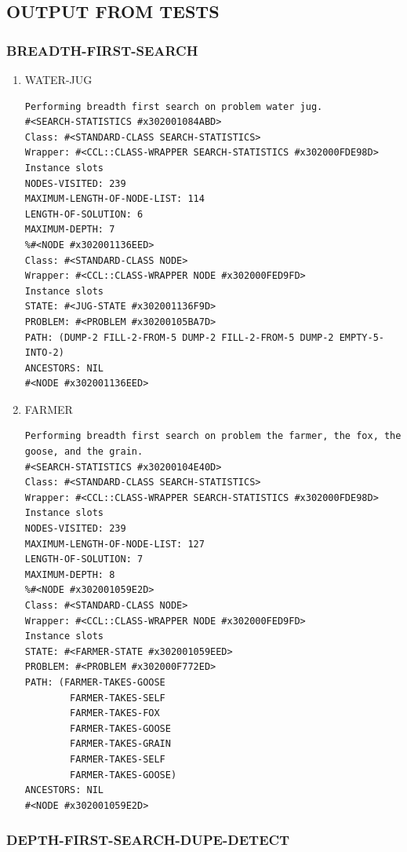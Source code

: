 \documentclass[a4paper,8pt]{article}
\begin{document}
\subsection{OUTPUT FROM TESTS}
\label{sec-1-2}

\subsubsection{BREADTH-FIRST-SEARCH}
\label{sec-1-2-1}
\begin{enumerate}
\item WATER-JUG
\label{sec-1-2-1-1}
\begin{verbatim}
Performing breadth first search on problem water jug.
#<SEARCH-STATISTICS #x302001084ABD>
Class: #<STANDARD-CLASS SEARCH-STATISTICS>
Wrapper: #<CCL::CLASS-WRAPPER SEARCH-STATISTICS #x302000FDE98D>
Instance slots
NODES-VISITED: 239
MAXIMUM-LENGTH-OF-NODE-LIST: 114
LENGTH-OF-SOLUTION: 6
MAXIMUM-DEPTH: 7
%#<NODE #x302001136EED>
Class: #<STANDARD-CLASS NODE>
Wrapper: #<CCL::CLASS-WRAPPER NODE #x302000FED9FD>
Instance slots
STATE: #<JUG-STATE #x302001136F9D>
PROBLEM: #<PROBLEM #x30200105BA7D>
PATH: (DUMP-2 FILL-2-FROM-5 DUMP-2 FILL-2-FROM-5 DUMP-2 EMPTY-5-INTO-2)
ANCESTORS: NIL
#<NODE #x302001136EED>
\end{verbatim}

\item FARMER
\label{sec-1-2-1-2}
\begin{verbatim}
Performing breadth first search on problem the farmer, the fox, the goose, and the grain.
#<SEARCH-STATISTICS #x30200104E40D>
Class: #<STANDARD-CLASS SEARCH-STATISTICS>
Wrapper: #<CCL::CLASS-WRAPPER SEARCH-STATISTICS #x302000FDE98D>
Instance slots
NODES-VISITED: 239
MAXIMUM-LENGTH-OF-NODE-LIST: 127
LENGTH-OF-SOLUTION: 7
MAXIMUM-DEPTH: 8
%#<NODE #x302001059E2D>
Class: #<STANDARD-CLASS NODE>
Wrapper: #<CCL::CLASS-WRAPPER NODE #x302000FED9FD>
Instance slots
STATE: #<FARMER-STATE #x302001059EED>
PROBLEM: #<PROBLEM #x302000F772ED>
PATH: (FARMER-TAKES-GOOSE
        FARMER-TAKES-SELF
        FARMER-TAKES-FOX
        FARMER-TAKES-GOOSE
        FARMER-TAKES-GRAIN
        FARMER-TAKES-SELF
        FARMER-TAKES-GOOSE)
ANCESTORS: NIL
#<NODE #x302001059E2D>
\end{verbatim}
\end{enumerate}

\subsubsection{DEPTH-FIRST-SEARCH-DUPE-DETECT}
\label{sec-1-2-2}
\end{document}

